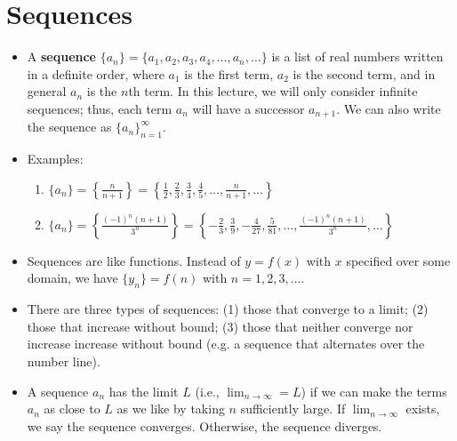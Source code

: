 \documentclass[11pt]{article}
\theoremstyle{definition}
\theoremstyle{remark}
\begin{document}
\section{Sequences}
\begin{itemize}
\item A \textbf{sequence} $\{a_n\} = \{a_1, a_2, a_3, a_4, \ldots, a_n, \ldots\}$ is a list of real numbers written in a definite order, where $a_1$ is the first term, $a_2$ is the second term, and in general $a_n$ is the $n$th term. In this lecture, we will only consider infinite sequences; thus, each term $a_n$ will have a successor $a_{n+1}$. We can also write the sequence as $\{a_n\}^{\infty}_{n=1}$.

\item Examples:
\begin{enumerate}
\item $\displaystyle \{a_n\}=\left\lbrace\frac{n}{n+1}\right\rbrace = \left\lbrace\frac{1}{2}, \frac{2}{3}, \frac{3}{4}, \frac{4}{5},\dots,\frac{n}{n+1},\dots \right\rbrace$ 
\item $\displaystyle \{a_n\}=\left\lbrace\frac{(-1)^n(n+1)}{3^n}\right\rbrace = \left\lbrace -\frac{2}{3}, \frac{3}{9}, -\frac{4}{27}, \frac{5}{81},\dots,\frac{(-1)^n(n+1)}{3^n},\dots \right\rbrace$ 
\end{enumerate}

\item Sequences are like functions. Instead of $y=f(x)$ with $x$ specified over some domain, we  have $\{y_n\}={f(n)}$ with $n=1, 2, 3, \dots.$

\item There are three types of sequences: (1) those that converge to a limit; (2) those that increase without bound; (3) those that neither converge nor increase increase without bound (e.g. a sequence that alternates over the number line). 

\item A sequence ${a_n}$ has the limit $L$ (i.e., $\lim_{n \to \infty} = L$) if we can make the terms $a_n$ as close to $L$ as we like by taking $n$ sufficiently large. If $\lim_{n\to\infty}$ exists, we say the sequence converges. Otherwise, the sequence diverges. 

\end{itemize}
\end{document}
